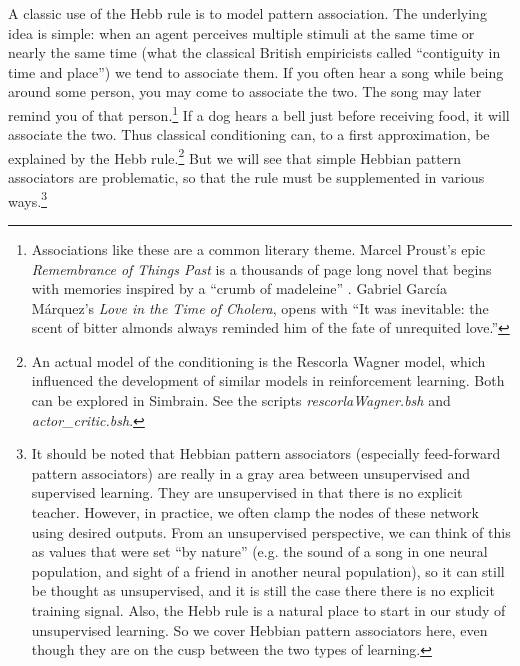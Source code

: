 A classic use of the Hebb rule is to model pattern association. The underlying idea is simple: when an agent perceives multiple stimuli at the same time or nearly the same time (what the classical British empiricists called ``contiguity in time and place'') we tend to associate them. If you often hear a song while being around some person, you may come to associate the two. The song may later remind you of that person.\footnote{Associations like these are a common literary theme. Marcel Proust's epic \emph{Remembrance of Things Past} is a thousands of page long novel that begins with memories inspired by a ``crumb of madeleine'' \cite{proust2006remembrance}. Gabriel Garc\'{i}a M\'{a}rquez's \emph{Love in the Time of Cholera}, opens with ``It was inevitable: the scent of bitter almonds always reminded him of the fate of unrequited love.''}  If a dog hears a bell just before receiving food, it will associate the two. Thus classical conditioning can, to a first approximation, be explained by the Hebb rule.\footnote{\label{hebb_updated}An actual model of the conditioning is the Rescorla Wagner model, which influenced the development of similar models in reinforcement learning. Both can be explored in Simbrain. See the scripts \emph{rescorlaWagner.bsh} and \emph{actor\_critic.bsh}.}   But we will see that simple Hebbian pattern associators are problematic, so that the rule must be supplemented in various ways.\footnote{\label{grayArea} It should be noted that Hebbian pattern associators (especially feed-forward pattern associators) are really in a gray area between unsupervised and supervised learning. They are unsupervised in that there is no explicit teacher. However, in practice, we often clamp the nodes of these network using desired outputs. From an unsupervised perspective, we can think of this as values that were set ``by nature'' (e.g. the sound of a song in one neural population, and sight of a friend in another neural population), so it can still be thought as unsupervised, and it is still the case there there is no explicit training signal. Also, the Hebb rule is a natural place to start in our study of unsupervised learning. So we cover Hebbian pattern associators here, even though they are on the cusp between the two types of learning.}



